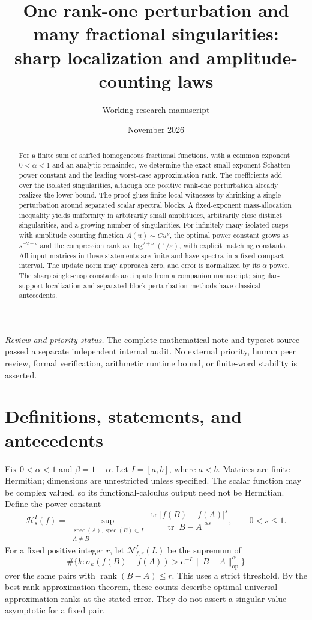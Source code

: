 \documentclass[11pt]{article}
\title{One rank-one perturbation and many fractional singularities:\\
sharp localization and amplitude-counting laws}
\author{Working research manuscript}
\date{November 2026}
\numberwithin{equation}{section}
\newcommand{\tr}{\operatorname{tr}}
\newcommand{\rank}{\operatorname{rank}}
\newcommand{\spec}{\operatorname{spec}}
\newcommand{\op}{\mathrm{op}}
\newcommand{\cH}{\mathcal H}
\newcommand{\cN}{\mathcal N}
\begin{document}
\maketitle

\begin{abstract}
For a finite sum of shifted homogeneous fractional functions, with a
common exponent $0<\alpha<1$ and an analytic remainder, we determine the
exact small-exponent Schatten power constant and the leading worst-case
approximation rank. The coefficients add over the isolated singularities,
although one positive rank-one perturbation already realizes the lower
bound. The proof glues finite local witnesses by shrinking a single
perturbation around separated scalar spectral blocks. A fixed-exponent
mass-allocation inequality yields uniformity in arbitrarily small
amplitudes, arbitrarily close distinct singularities, and a growing
number of singularities. For infinitely many isolated cusps with amplitude
counting function $A(u)\sim C u^\nu$, the optimal power constant grows as
$s^{-2-\nu}$ and the compression rank as $\log^{2+\nu}(1/\varepsilon)$,
with explicit matching constants. All input matrices in these statements
are finite and have spectra in a fixed compact interval. The update norm
may approach zero, and error is normalized by its $\alpha$ power.
The sharp single-cusp constants are inputs from a companion manuscript;
singular-support localization and separated-block perturbation methods
have classical antecedents.
\end{abstract}

\noindent\textit{Review and priority status.}
The complete mathematical note and typeset source passed a separate
independent internal audit. No external priority, human peer review,
formal verification, arithmetic runtime bound, or finite-word stability
is asserted.

\section{Definitions, statements, and antecedents}

Fix $0<\alpha<1$ and $\beta=1-\alpha$. Let $I=[a,b]$, where $a<b$.
Matrices are finite Hermitian; dimensions are unrestricted unless
specified. The scalar function may be complex valued, so its
functional-calculus output need not be Hermitian. Define the power constant
\begin{equation}\label{eq:H}
 \cH_s^I(f)=
 \sup_{\substack{\spec(A),\spec(B)\subset I\\A\ne B}}
 \frac{\tr|f(B)-f(A)|^s}{\tr|B-A|^{\alpha s}},\qquad 0<s\le1.
\end{equation}
For a fixed positive integer $r$, let $\cN_{f,r}^I(L)$ be the supremum of
\begin{equation}\label{eq:N}
 \#\{k:\sigma_k(f(B)-f(A))>e^{-L}\|B-A\|_{\op}^{\alpha}\}
\end{equation}
over the same pairs with $\rank(B-A)\le r$.
This uses a strict threshold. By the best-rank approximation theorem,
these counts describe optimal universal approximation ranks at the stated
error. They do not assert a singular-value asymptotic for a fixed pair.
\end{document}
